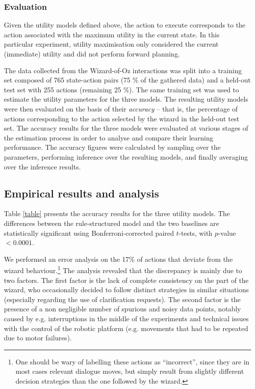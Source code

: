 \subsubsection*{Evaluation}

Given the utility models defined above, the action to execute corresponds to the action associated with the maximum utility in the current state. In this particular experiment, utility maximisation only considered the current (immediate) utility and did not perform forward planning.

The data collected from the Wizard-of-Oz interactions was split into a training set composed of 765 state-action pairs (75 \% of the gathered data) and a held-out test set with 255 actions (remaining 25 \%). The same training set was used to estimate the utility parameters for the three models.  The resulting utility models were then evaluated on the basis of their \textit{accuracy} -- that is, the percentage of actions corresponding to the action selected by the wizard in the held-out test set. The accuracy results for the three models were evaluated at various stages of the estimation process in order to analyse and compare their learning performance. The accuracy figures were calculated by sampling over the parameters, performing inference over the resulting models, and finally averaging over the inference results.  

\subsection{Empirical results and analysis}
\label{sec:wozlearning-experiments-results}

Table \ref{table} presents the accuracy results for the three utility models. The differences between the rule-structured model and the two baselines are statistically significant using Bonferroni-corrected paired $t$-tests, with $p$-value $< 0.0001$.   

We performed an error analysis on the 17\% of actions that deviate from the wizard behaviour.\footnote{One should be wary of labelling these actions as ``incorrect'', since they are in most cases relevant dialogue moves, but simply result from slightly different decision strategies than the one followed by the wizard.} The analysis revealed that the discrepancy is mainly due to two factors.  The first factor is the lack of complete consistency on the part of the wizard, who occasionally decided to follow distinct strategies in similar situations (especially regarding the use of clarification requests). The second factor is the presence of a non negligible number of spurious and noisy data points, notably caused by e.g. interruptions in the middle of the experiments and technical issues with the control of the robotic platform (e.g. movements that had to be repeated due to motor failures).


